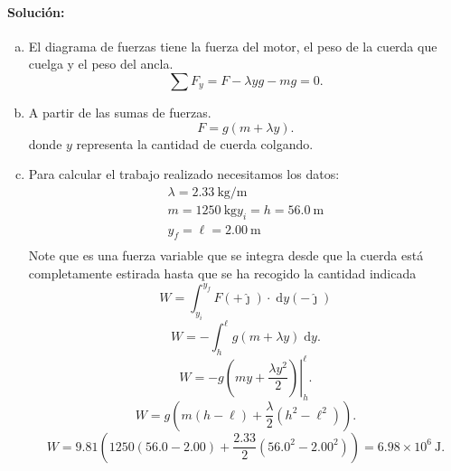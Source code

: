 \documentclass[
  12pt,
]{article}
\newcommand{\jj}{\hat{\jmath}}
\newcommand{\unit}[1]{\:\mathrm{#1}}
\begin{document}
  \paragraph{Solución:}
\begin{enumerate}[a)]
  \item  El diagrama de fuerzas tiene la fuerza del motor, el peso de la cuerda 
    que cuelga y el peso del ancla.
   \[
     \sum F_y = F - \lambda y g - m g = 0
   .\] 
  \item A partir de las sumas de fuerzas.
\[
  F = g\left( m + \lambda y \right) 
.\] 
donde $y$ representa la cantidad de cuerda colgando.
  \item Para calcular el trabajo realizado necesitamos los datos:
  \[\begin{array}{l}
    \lambda = 2.33\unit{kg/m} \\
    m = 1250\unit{kg}
    y_i = h = 56.0\unit{m}\\
    y_f = \ell = 2.00\unit{m}\\
  \end{array}\]
  Note que es una fuerza variable que se integra desde que la cuerda está completamente
  estirada hasta que se ha recogido la cantidad indicada
  \[
    W = \int_{y_i}^{y_f} F(+\jj) \cdot \;\mathrm{d}y(-\jj)
  \] 
  \[
    W = -\int_h^{\ell} g\left( m + \lambda y \right) \;\mathrm{d}y
  .\] 
  \[
    W = -g\left. \left( m y + \frac{\lambda y^2}{2} \right)  \right|_h^{\ell}
  .\] 
  \[
    W = g\left( m (h - \ell ) + \frac{\lambda}{2}(h^2-\ell^2) \right) 
  .\] 
  \[
    W = 9.81 \left(  1250(56.0-2.00) + \frac{2.33}{2}(56.0^2-2.00^2) \right) 
    = 6.98\times 10^{6}\unit{J} 
  .\] 


\end{enumerate}
\end{document}
